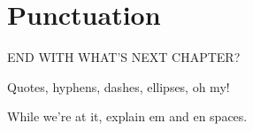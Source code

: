 \chapter{Punctuation}
\label{punctuation}

END WITH WHAT'S NEXT CHAPTER?

Quotes, hyphens, dashes, ellipses, oh my!

While we're at it, explain em and en spaces.
